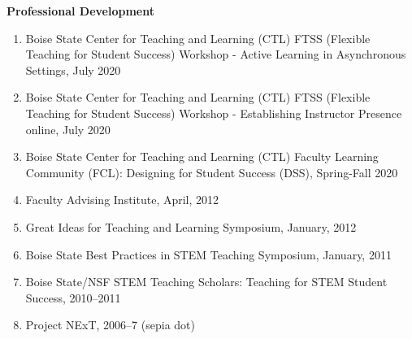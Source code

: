 \documentclass[12pt]{article}
\begin{document}
\textbf{Professional Development}
\begin{enumerate}[revarabic,labelwidth=*]
\item Boise State Center for Teaching and Learning (CTL) FTSS (Flexible Teaching for Student Success) Workshop -
Active Learning in Asynchronous Settings, July 2020
\item Boise State Center for Teaching and Learning (CTL) FTSS (Flexible Teaching for Student Success) Workshop -
Establishing Instructor Presence online, July 2020
\item Boise State Center for Teaching and Learning (CTL) Faculty Learning Community (FCL): Designing for Student Success (DSS), Spring-Fall 2020
\item Faculty Advising Institute, April, 2012
\item Great Ideas for Teaching and Learning Symposium, January, 2012
\item Boise State Best Practices in STEM Teaching Symposium, January, 2011
\item Boise State/NSF STEM Teaching Scholars: Teaching for STEM Student Success, 2010--2011
\item Project NExT, 2006--7 (sepia dot)%
\end{enumerate}
\end{document}
